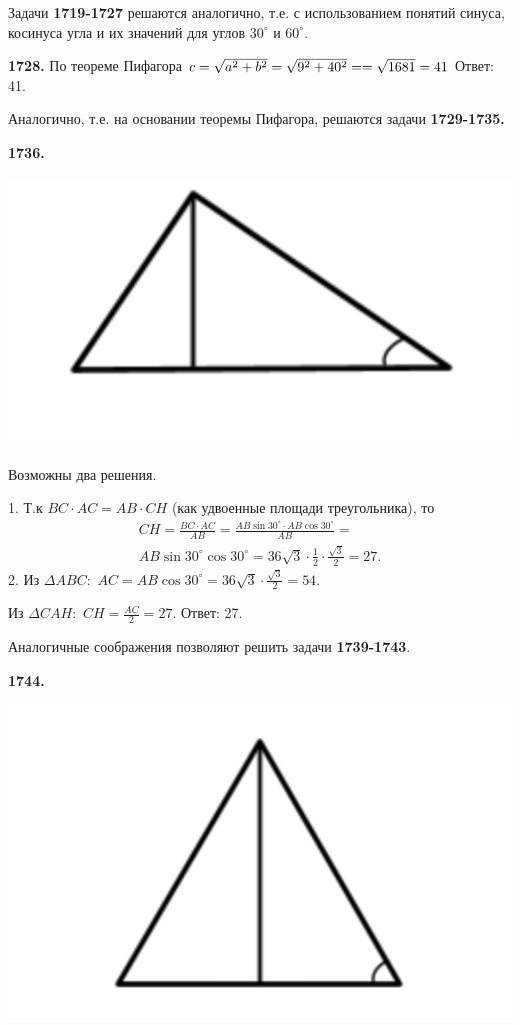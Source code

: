 Задачи \textbf{1719-1727} решаются аналогично, т.е. с использованием понятий синуса, косинуса угла и их значений для углов $30^\circ$ и $60^\circ$.

\textbf{1728.} По теореме Пифагора $c = \sqrt{a^2 + b^2} = \sqrt{9^2 + 40^2} = \linebreak = \sqrt{1681} = 41$ \newline \null \hspace*{\fill} Ответ: 41.

Аналогично, т.е. на основании теоремы Пифагора,  решаются задачи \textbf{1729-1735.}

\textbf{1736.}


{\centering \includegraphics[width=0.4\linewidth]{Geometry/Content/2.png}
	
}

Возможны два решения.

1. Т.к $BC \cdot AC = AB \cdot CH$ (как удвоенные площади треугольника), то 
\begin{eqnarray*}
CH = \frac{BC \cdot AC}{AB} = \frac{AB \sin{30^\circ}\cdot AB \cos{30^\circ}}{AB} = \\AB \sin{30^\circ}\cos{30^\circ} = 36\sqrt{3}\cdot\frac{1}{2}\cdot\frac{\sqrt{3}}{2} = 27.
\end{eqnarray*}
2. Из $\Delta ABC:$ $AC = AB\cos{30^\circ} = 36\sqrt{3}\cdot \frac{\sqrt{3}}{2} = 54.$

Из $\Delta CAH:$ $CH = \frac{AC}{2} = 27.$ \newline \null \hspace*{\fill} Ответ: 27.

\clearpage 

Аналогичные соображения позволяют решить задачи  \textbf{1739-1743}.

\textbf{1744.}

{\centering \includegraphics[width=0.4\linewidth]{Geometry/Content/3.png}
	
}

